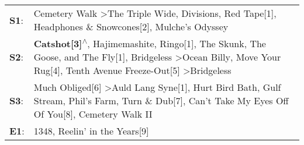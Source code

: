 \begin{supertabular}{p{0.03\textwidth}p{0.92\textwidth}}
 \textbf{S1}:  &                                                                                                                                                                        Cemetery Walk\textsuperscript{} \textgreater \enspace The Triple Wide\textsuperscript{}, \enspace Divisions\textsuperscript{}, \enspace Red Tape[1]\textsuperscript{}, \enspace Headphones \& Snowcones[2]\textsuperscript{}, \enspace Mulche's Odyssey\textsuperscript{}  \enspace  \\
 \textbf{S2}:  &  \textbf{Catshot[3]\textsuperscript{$\wedge$}}, \enspace Hajimemashite\textsuperscript{}, \enspace Ringo[1]\textsuperscript{}, \enspace The Skunk, The Goose, and The Fly[1]\textsuperscript{}, \enspace Bridgeless\textsuperscript{} \textgreater \enspace Ocean Billy\textsuperscript{}, \enspace Move Your Rug[4]\textsuperscript{}, \enspace Tenth Avenue Freeze-Out[5]\textsuperscript{} \textgreater \enspace Bridgeless\textsuperscript{}  \enspace  \\
 \textbf{S3}:  &                                                                      Much Obliged[6]\textsuperscript{} \textgreater \enspace Auld Lang Syne[1]\textsuperscript{}, \enspace Hurt Bird Bath\textsuperscript{}, \enspace Gulf Stream\textsuperscript{}, \enspace Phil's Farm\textsuperscript{}, \enspace Turn \& Dub[7]\textsuperscript{}, \enspace Can't Take My Eyes Off Of You[8]\textsuperscript{}, \enspace Cemetery Walk II\textsuperscript{}  \enspace  \\
 \textbf{E1}:  &                                                                                                                                                                                                                                                                                                                                                                       1348\textsuperscript{}, \enspace Reelin' in the Years[9]\textsuperscript{}  \enspace  \\
\end{supertabular}
